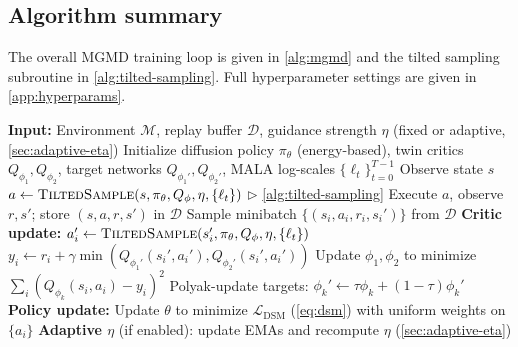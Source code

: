 \documentclass{article}
\theoremstyle{plain}
\theoremstyle{definition}
\theoremstyle{remark}
\begin{document}
\subsection{Algorithm summary}
\label{sec:algorithm}

The overall MGMD training loop is given in \cref{alg:mgmd} and the tilted sampling subroutine in \cref{alg:tilted-sampling}.
Full hyperparameter settings are given in \cref{app:hyperparams}.

\begin{algorithm}[t]
\caption{MGMD: MALA-Guided Mirror Descent}
\label{alg:mgmd}
\begin{algorithmic}[1]
\STATE \textbf{Input:} Environment $\mathcal{M}$, replay buffer $\mathcal{D}$, guidance strength $\eta$ (fixed or adaptive, \cref{sec:adaptive-eta})
\STATE Initialize diffusion policy $\pi_\theta$ (energy-based), twin critics $Q_{\phi_1}, Q_{\phi_2}$, target networks $Q_{\phi_1'}, Q_{\phi_2'}$, MALA log-scales $\{\ell_t\}_{t=0}^{T-1}$
  \STATE Observe state $s$
  \STATE $a \leftarrow \textsc{TiltedSample}(s, \pi_\theta, Q_\phi, \eta, \{\ell_t\})$ \hfill $\triangleright$ \cref{alg:tilted-sampling}
  \STATE Execute $a$, observe $r, s'$; store $(s, a, r, s')$ in $\mathcal{D}$
    \STATE Sample minibatch $\{(s_i, a_i, r_i, s_i')\}$ from $\mathcal{D}$
    \STATE \textbf{Critic update:}
    \STATE \quad $a_i' \leftarrow \textsc{TiltedSample}(s_i', \pi_\theta, Q_\phi, \eta, \{\ell_t\})$
    \STATE \quad $y_i \leftarrow r_i + \gamma \min(Q_{\phi_1'}(s_i', a_i'), Q_{\phi_2'}(s_i', a_i'))$
    \STATE \quad Update $\phi_1, \phi_2$ to minimize $\sum_i (Q_{\phi_k}(s_i, a_i) - y_i)^2$
    \STATE \quad Polyak-update targets: $\phi_k' \leftarrow \tau \phi_k + (1{-}\tau)\phi_k'$
    \STATE \textbf{Policy update:}
    \STATE \quad Update $\theta$ to minimize $\mathcal{L}_{\text{DSM}}$ (\cref{eq:dsm}) with uniform weights on $\{a_i\}$
    \STATE \textbf{Adaptive $\eta$} (if enabled): update EMAs and recompute $\eta$ (\cref{sec:adaptive-eta})
  \ENDFOR
\ENDFOR
\end{algorithmic}
\end{algorithm}
\end{document}
